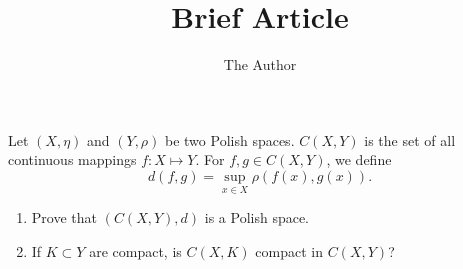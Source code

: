 \documentclass[11pt]{amsart}
\title{Brief Article}
\author{The Author}
\begin{document}
Let $(X, \eta)$ and $(Y, \rho)$ be two Polish spaces.
$C(X, Y)$ is the set of all continuous mappings $f: X\mapsto Y$.
For $f, g\in C(X, Y)$, we define
$$d (f, g) = \sup_{x\in X} \rho(f(x),  g(x)).$$
\begin{enumerate}
\item
Prove that $(C(X, Y), d)$ is a Polish space.
\item If $K \subset Y$ are compact, is $C(X, K)$ compact in $C(X, Y)$?
\iffalse
\item Let $F \subset C(X, K)$ be a equicontinuous. This means, $\forall \epsilon >0$, there $\exists \delta>0$, such that
\begin{itemize}
\item
if $\eta(x, y) < \delta$ and $f\in F$, then $\rho(f(x), f(y))<\epsilon$.
\end{itemize}
Is $F$ compact in $C(X, Y)$?
\fi
\end{enumerate}
\end{document}
